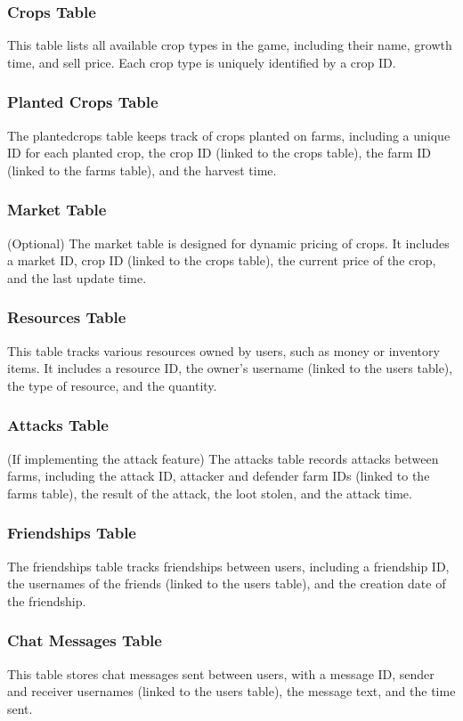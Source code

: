 \documentclass[12pt]{article}
\begin{document}
\subsubsection{Crops Table}
This table lists all available crop types in the game, including their name, growth time, and sell price. Each crop type is uniquely identified by a crop ID.

\subsubsection{Planted Crops Table}
The planted\textunderscore crops table keeps track of crops planted on farms, including a unique ID for each planted crop, the crop ID (linked to the crops table), the farm ID (linked to the farms table), and the harvest time.

\subsubsection{Market Table}
(Optional) The market table is designed for dynamic pricing of crops. It includes a market ID, crop ID (linked to the crops table), the current price of the crop, and the last update time.

\subsubsection{Resources Table}
This table tracks various resources owned by users, such as money or inventory items. It includes a resource ID, the owner's username (linked to the users table), the type of resource, and the quantity.

\subsubsection{Attacks Table}
(If implementing the attack feature) The attacks table records attacks between farms, including the attack ID, attacker and defender farm IDs (linked to the farms table), the result of the attack, the loot stolen, and the attack time.

\subsubsection{Friendships Table}
The friendships table tracks friendships between users, including a friendship ID, the usernames of the friends (linked to the users table), and the creation date of the friendship.

\subsubsection{Chat Messages Table}
This table stores chat messages sent between users, with a message ID, sender and receiver usernames (linked to the users table), the message text, and the time sent.
\end{document}
